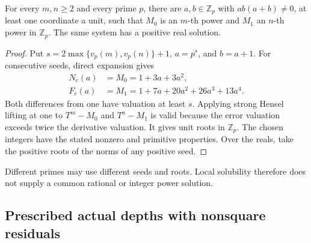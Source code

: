 \begin{theorem}\label{lp-local}
For every $m,n\ge2$ and every prime $p$, there are $a,b\in\mathbb Z_p$
with $ab(a+b)\ne0$, at least one coordinate a unit, such that $M_0$
is an $m$-th power and $M_1$ an $n$-th power in $\mathbb Z_p$.
The same system has a positive real solution.
\end{theorem}
\begin{proof}
Put $s=2\max\{v_p(m),v_p(n)\}+1$, $a=p^s$, and $b=a+1$.
For consecutive seeds, direct expansion gives
\begin{align}
 N_c(a)&=M_0=1+3a+3a^2,\label{lp-norm-polynomial}\\
 F_c(a)&=M_1=1+7a+20a^2+26a^3+13a^4.\label{lp-quartic-polynomial}
\end{align}
Both differences from one have valuation at least $s$. Applying strong
Hensel lifting at one to $T^m-M_0$ and $T^n-M_1$ is valid because
the error valuation exceeds twice the derivative valuation. It gives
unit roots in $\mathbb Z_p$. The chosen integers have the stated
nonzero and primitive properties. Over the reals, take the positive
roots of the norms of any positive seed.
\end{proof}
Different primes may use different seeds and roots. Local solubility
therefore does not supply a common rational or integer power solution.

\subsection{Prescribed actual depths with nonsquare residuals}

